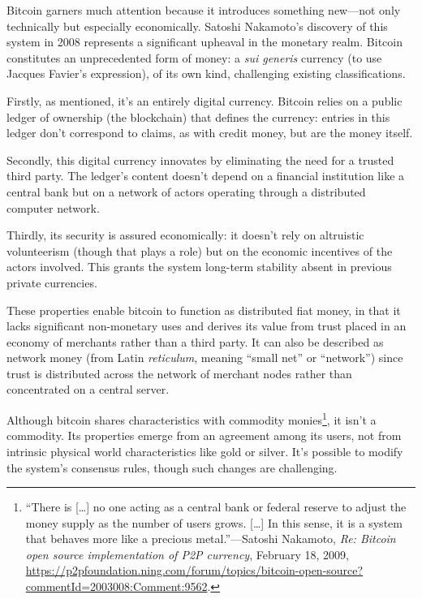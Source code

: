 \documentclass[
  a5paper,
  smalldemyvopaper,10pt,twoside,onecolumn,openright,extrafontsizes,hidelinks]{memoir}
\begin{document}

Bitcoin garners much attention because it introduces something new---not
only technically but especially economically. Satoshi Nakamoto's
discovery of this system in 2008 represents a significant upheaval in
the monetary realm. Bitcoin constitutes an unprecedented form of money:
a \emph{sui generis} currency (to use Jacques Favier's expression), of
its own kind, challenging existing classifications.

Firstly, as mentioned, it's an entirely digital currency. Bitcoin relies
on a public ledger of ownership (the blockchain) that defines the
currency: entries in this ledger don't correspond to claims, as with
credit money, but are the money itself.

Secondly, this digital currency innovates by eliminating the need for a
trusted third party. The ledger's content doesn't depend on a financial
institution like a central bank but on a network of actors operating
through a distributed computer network.

Thirdly, its security is assured economically: it doesn't rely on
altruistic volunteerism (though that plays a role) but on the economic
incentives of the actors involved. This grants the system long-term
stability absent in previous private currencies.

These properties enable bitcoin to function as distributed fiat money,
in that it lacks significant non-monetary uses and derives its value
from trust placed in an economy of merchants rather than a third party.
It can also be described as network money (from Latin \emph{reticulum},
meaning ``small net'' or ``network'') since trust is distributed across
the network of merchant nodes rather than concentrated on a central
server.

Although bitcoin shares characteristics with commodity
monies\footnote{``There is {[}\ldots{]} no one acting as a central bank
  or federal reserve to adjust the money supply as the number of users
  grows. {[}\ldots{]} In this sense, it is a system that behaves more
  like a precious metal.''---Satoshi Nakamoto, \emph{Re: Bitcoin open
  source implementation of P2P currency}, February 18, 2009,
  \url{https://p2pfoundation.ning.com/forum/topics/bitcoin-open-source?commentId=2003008:Comment:9562}.},
it isn't a commodity. Its properties emerge from an agreement among its
users, not from intrinsic physical world characteristics like gold or
silver. It's possible to modify the system's consensus rules, though
such changes are challenging.
\end{document}
